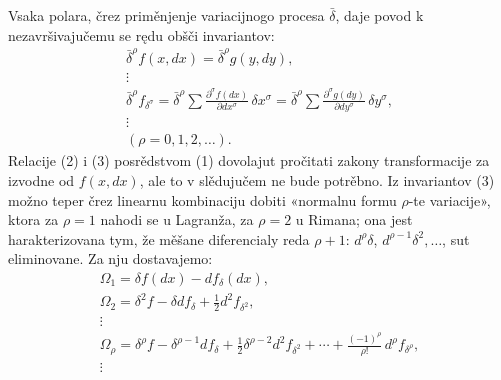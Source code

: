 \documentclass[11pt]{article}
\providecommand{\bdelta}{\bar{\delta}}
\begin{document}
Vsaka polara, črez priměnjenje variacijnogo procesa \(\bdelta\), daje povod k nezavršivajučemu se rędu obšči invariantov:
\begin{equation}
\begin{gathered}
\bdelta^\rho f(x,dx)=\bdelta^\rho g(y,dy),\\
\vdots\\
\bdelta^\rho f_{\delta^\sigma}
=\bdelta^\rho\sum\frac{\partial^\sigma f(dx)}{\partial dx^\sigma}\,
\delta x^\sigma
=\bdelta^\rho\sum\frac{\partial^\sigma g(dy)}{\partial dy^\sigma}\,
\delta y^\sigma,\\
\vdots\\[0.2em]
(\rho=0,1,2,\ldots).
\end{gathered}
\tag{3}
\end{equation}
Relacije (2) i (3) posrědstvom (1) dovolajut pročitati zakony transformacije za izvodne od \(f(x,dx)\), ale to v slědujučem ne bude potrěbno. Iz invariantov (3) možno teper črez linearnu kombinaciju dobiti «normalnu formu \(\rho\)-te variacije», ktora za \(\rho=1\) nahodi se u Lagranža, za \(\rho=2\) u Rimana; ona jest harakterizovana tym, že měšane diferencialy reda \(\rho+1\): \(d^\rho\delta\), \(d^{\rho-1}\delta^2,\ldots\), sut eliminovane. Za nju dostavajemo:
\begin{equation}
\begin{gathered}
\Omega_1=\delta f(dx)-d f_\delta(dx),\\
\Omega_2=\delta^2 f-\delta d f_\delta+\frac12 d^2 f_{\delta^2},\\
\vdots\\
\Omega_\rho=\delta^\rho f-\delta^{\rho-1}d f_\delta
+\frac12\delta^{\rho-2}d^2 f_{\delta^2}
+\cdots+\frac{(-1)^\rho}{\rho!}\,d^\rho f_{\delta^\rho},\\
\vdots
\end{gathered}
\tag{4}
\end{equation}
\end{document}
